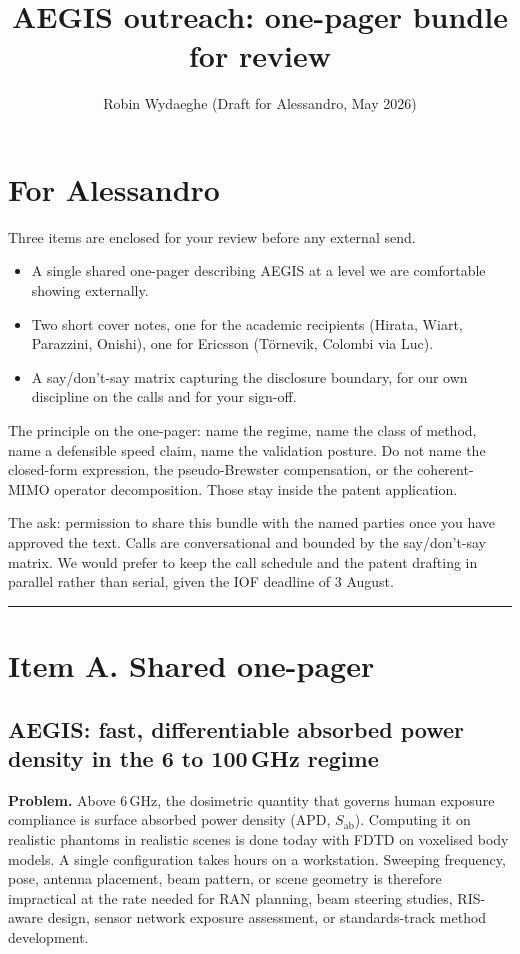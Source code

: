 \documentclass[11pt,a4paper]{article}
\title{\vspace{-1.5em}AEGIS outreach: one-pager bundle for review}
\author{Robin Wydaeghe \quad (Draft for Alessandro, May 2026)}
\date{}
\begin{document}
\maketitle
\vspace{-1.5em}

\section*{For Alessandro}
Three items are enclosed for your review before any external send.

\begin{itemize}
  \item A single shared one-pager describing AEGIS at a level we are comfortable showing externally.
  \item Two short cover notes, one for the academic recipients (Hirata, Wiart, Parazzini, Onishi), one for Ericsson (T\"ornevik, Colombi via Luc).
  \item A say/don't-say matrix capturing the disclosure boundary, for our own discipline on the calls and for your sign-off.
\end{itemize}

The principle on the one-pager: name the regime, name the class of method, name a defensible speed claim, name the validation posture. Do not name the closed-form expression, the pseudo-Brewster compensation, or the coherent-MIMO operator decomposition. Those stay inside the patent application.

The ask: permission to share this bundle with the named parties once you have approved the text. Calls are conversational and bounded by the say/don't-say matrix. We would prefer to keep the call schedule and the patent drafting in parallel rather than serial, given the IOF deadline of 3 August.

\vspace{0.6em}
\hrule
\vspace{0.6em}

\section*{Item A. Shared one-pager}

\subsection*{AEGIS: fast, differentiable absorbed power density in the 6 to 100\,GHz regime}

\textbf{Problem.} Above 6\,GHz, the dosimetric quantity that governs human exposure compliance is surface absorbed power density (APD, $S_\mathrm{ab}$). Computing it on realistic phantoms in realistic scenes is done today with FDTD on voxelised body models. A single configuration takes hours on a workstation. Sweeping frequency, pose, antenna placement, beam pattern, or scene geometry is therefore impractical at the rate needed for RAN planning, beam steering studies, RIS-aware design, sensor network exposure assessment, or standards-track method development.
\end{document}
